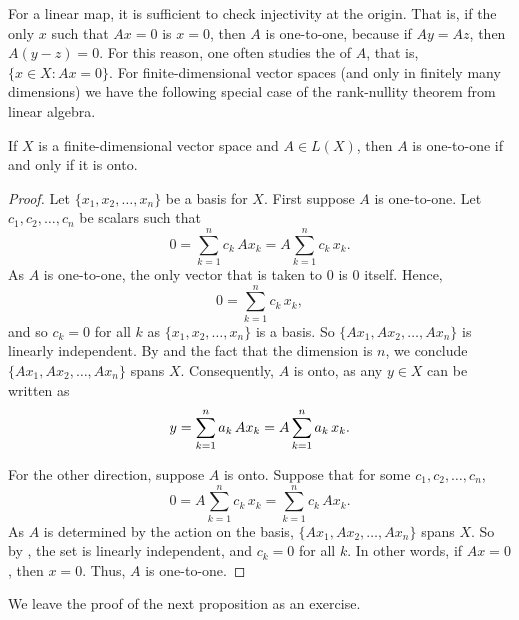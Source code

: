 For a linear map, it is sufficient to check injectivity at the origin.
That is, if the only $x$ such that $Ax =0$ is $x=0$, then $A$ is one-to-one,
because if $Ay=Az$, then $A(y-z) = 0$.  For this reason, 
one often studies the \emph{} of $A$, that is,
$\{ x \in X : Ax = 0 \}$.
For finite-dimensional vector spaces (and only in finitely many dimensions)
we have the following special case of the
rank-nullity theorem from linear algebra.

\begin{prop} \label{mv:prop:lin11onto}
If $X$ is a finite-dimensional vector space and $A \in L(X)$, then $A$ is one-to-one if and only if it is onto.
\end{prop}

\begin{proof}
Let $\{ x_1,x_2,\ldots,x_n \}$ be a basis for $X$.
First suppose $A$ is one-to-one.  Let $c_1,c_2,\ldots,c_n$ be scalars such that
\begin{equation*}
0 =
\sum_{k=1}^n c_k \, Ax_k =
A\sum_{k=1}^n c_k \, x_k 
.
\end{equation*}
As $A$ is one-to-one,
the only vector that is taken to 0 is 0 itself.  
Hence,
\begin{equation*}
0 =
\sum_{k=1}^n c_k \, x_k,
\end{equation*}
and so $c_k = 0$ for all $k$ as $\{ x_1,x_2,\ldots,x_n \}$ is a basis.
So $\{ Ax_1, Ax_2, \ldots, Ax_n \}$ is linearly independent.
By 
and the fact that the dimension is $n$, we conclude
$\{ Ax_1, Ax_2, \ldots, Ax_n \}$ spans $X$.  Consequently, $A$ is onto,
as any $y \in X$ can be written as
\begin{equation*}
y = \sum_{k=1}^n a_k \, Ax_k =
A\sum_{k=1}^n a_k \, x_k .
\avoidbreak
\end{equation*}

For the other direction, suppose $A$ is onto.
Suppose that for some
$c_1,c_2,\ldots,c_n$,
\begin{equation*}
0 = A\sum_{k=1}^n c_k \, x_k =
\sum_{k=1}^n c_k \, Ax_k .
\end{equation*}
As $A$ is determined by the action on the basis,
$\{ Ax_1, Ax_2, \ldots, Ax_n \}$ spans $X$.
So by , the set is linearly independent,
and $c_k = 0$ for all $k$.  In other words, if $Ax = 0$, then $x=0$.
Thus, $A$ is one-to-one.
\end{proof}

We leave the proof of the next proposition as an exercise.

